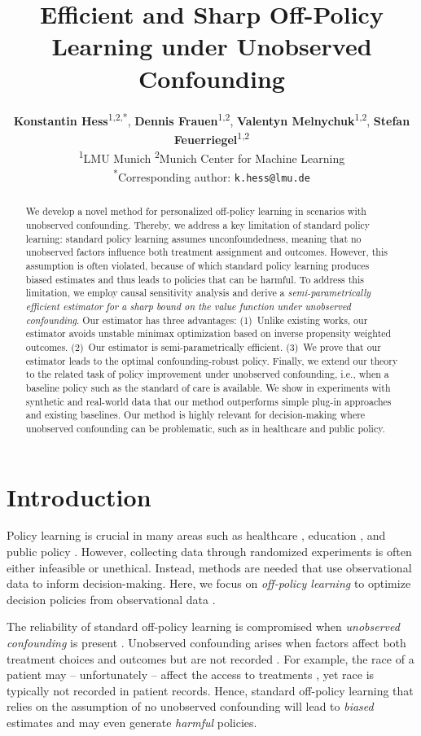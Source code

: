 \documentclass{article} %
\title{Efficient and Sharp Off-Policy Learning under Unobserved Confounding}
\author{
\textbf{Konstantin Hess}\textsuperscript{1,2,*},
\textbf{Dennis Frauen}\textsuperscript{1,2},
\textbf{Valentyn Melnychuk}\textsuperscript{1,2},
\textbf{Stefan Feuerriegel}\textsuperscript{1,2}\\[0.8em]
\textsuperscript{1}LMU Munich \quad
\textsuperscript{2}Munich Center for Machine Learning \quad
\\
\textsuperscript{*}{Corresponding author: \texttt{k.hess@lmu.de}}
}
\theoremstyle{plain}
\theoremstyle{definition}
\theoremstyle{remark}
\begin{document}
\maketitle

\begin{abstract}
We develop a novel method for personalized off-policy learning in scenarios with unobserved confounding. Thereby, we address a key limitation of standard policy learning: standard policy learning assumes unconfoundedness, meaning that no unobserved factors influence both treatment assignment and outcomes. However, this assumption is often violated, because of which standard policy learning produces biased estimates and thus leads to policies that can be harmful. To address this limitation, we employ causal sensitivity analysis and derive a \emph{semi-parametrically efficient estimator for a sharp bound on the value function under unobserved confounding}. Our estimator has three advantages: (1)~Unlike existing works, our estimator avoids unstable minimax optimization based on inverse propensity weighted outcomes. (2)~Our estimator is semi-parametrically efficient. (3)~We prove that our estimator leads to the {optimal} confounding-robust policy. Finally, we extend our theory to the related task of {policy improvement} under unobserved confounding, i.e., when a baseline policy such as the standard of care is available. We show in experiments with synthetic and real-world data that our method outperforms simple plug-in approaches and existing baselines. Our method is highly relevant for decision-making where unobserved confounding can be problematic, such as in healthcare and public policy.
\end{abstract}

\section{Introduction}\label{sec:intro}

Policy learning is crucial in many areas such as healthcare \citep{Feuerriegel.2024,Kraus.2023}, education \citep{Chan.2023}, and public policy \citep{Ladi.2020}. However, collecting data through randomized experiments is often either infeasible or unethical. Instead, methods are needed that use observational data to inform decision-making. Here, we focus on \emph{off-policy learning} to optimize decision policies from observational data \citep{Athey.2021}.


The reliability of standard off-policy learning is compromised when \emph{unobserved confounding} is present \citep{Kallus.2019}. Unobserved confounding arises when factors affect both treatment choices and outcomes but are not recorded \citep{Pearl.2009}. For example, the race of a patient may -- unfortunately -- affect the access to treatments \citep{Obermeyer.2019}, yet race is typically not recorded in patient records. Hence, standard off-policy learning that relies on the assumption of no unobserved confounding will lead to \emph{biased} estimates and may even generate \emph{harmful} policies.
\end{document}
